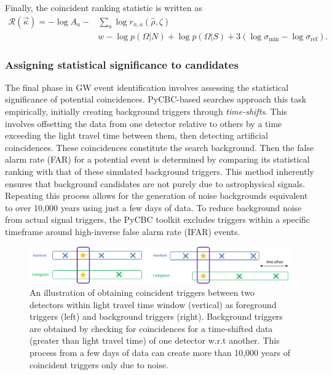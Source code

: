 Finally, the coincident ranking statistic is written as
\begin{align}
    \mathcal{R}(\vec{\kappa}) = -\log A_a - &\sum_{a}\log r_{n,a}(\hat{\rho},\zeta) \\ &w- \log p(\Omega|N) + \log p(\Omega|S) + 3(\log \sigma_{\min} - \log\sigma_{\text{ref}}).
\end{align}

\subsubsection{Assigning statistical significance to candidates}
The final phase in GW event identification involves assessing the statistical significance of potential coincidences. PyCBC-based searches approach this task empirically, initially creating background triggers through \textit{time-shifts}. This involves offsetting the data from one detector relative to others by a time exceeding the light travel time between them, then detecting artificial coincidences. These coincidences constitute the search background. Then the false alarm rate (FAR) for a potential event is determined by comparing its statistical ranking with that of these simulated background triggers. This method inherently ensures that background candidates are not purely due to astrophysical signals. Repeating this process allows for the generation of noise backgrounds equivalent to over 10,000 years using just a few days of data. To reduce background noise from actual signal triggers, the PyCBC toolkit excludes triggers within a specific timeframe around high-inverse false alarm rate (IFAR) events.

\begin{figure}
    \centering
    \includegraphics[width=\linewidth]{figures/current_catalogs/Time-shifts.png}
    \caption{An illustration of obtaining coincident triggers between two detectors within light travel time window (vertical) as foreground triggers (left) and background triggers (right). Background triggers are obtained by checking for coincidences for a time-shifted data (greater than light travel time) of one detector w.r.t another. This process from a few days of data can create more than 10,000 years of coincident triggers only due to noise.}
    \label{fig:Time-shifts}
\end{figure}

